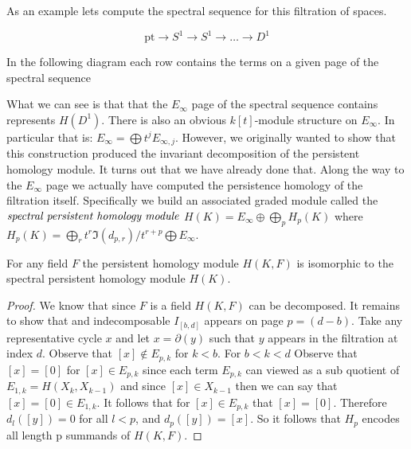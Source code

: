 As an example lets compute the spectral sequence for this filtration of spaces.
\begin{example}
\[ \textrm{pt} \rightarrow S^1 \rightarrow S^1 \rightarrow \ldots \rightarrow D^1 \] 
\end{example}
In the following diagram each row contains the terms on a given page of the spectral sequence
\begin{tikzcd}
\end{tikzcd}

What we can see is that that the $E_\infty$ page of the spectral sequence contains represents $H(D^1)$. There is also an obvious $k[t]$-module structure on $E_\infty$. In particular that is: $E_\infty = \bigoplus t^j E_{\infty,j}$. However, we originally wanted to show that this construction produced the invariant decomposition of the persistent homology module. It turns out that we have already done that. Along the way to the $E_\infty$ page we actually have computed the persistence homology of the filtration itself. Specifically we build an associated graded module called the $\emph{spectral persistent homology module}$ $H(K) = E_\infty \oplus \bigoplus_p H_p(K)$ where $H_p(K) = \bigoplus_r t^r \Im(d_{p,r}) / t^{r+p} \bigoplus E_\infty$.
\begin{theorem}
For any field $F$ the persistent homology module $H(K,F)$ is isomorphic to the spectral persistent homology module $H(K)$.
\end{theorem}
\begin{proof}
We know that since $F$ is a field $H(K,F)$ can be decomposed. It remains to show that and indecomposable $I_{[b,d]}$ appears on page $p = (d-b)$. Take any representative cycle $x$ and let $x = \partial(y)$ such that $y$ appears in the filtration at index $d$. Observe that $[x] \notin E_{p,k}$ for $k < b$. For $b < k < d$ Observe that $[x]  = [0]$ for $[x] \in E_{p,k}$  since each term $E_{p,k}$ can viewed as a sub quotient of $E_{1,k} = H(X_k, X_{k-1})$ and since $[x] \in X_{k-1}$ then we can say that $[x] = [0] \in E_{1,k} $. It follows that for $[x] \in E_{p,k}$ that $[x] = [0]$. Therefore $d_l([y]) = 0$ for all $l < p$, and $d_p([y])=[x]$. So it follows that $H_p$ encodes all length p summands of $H(K,F)$.
\end{proof}
